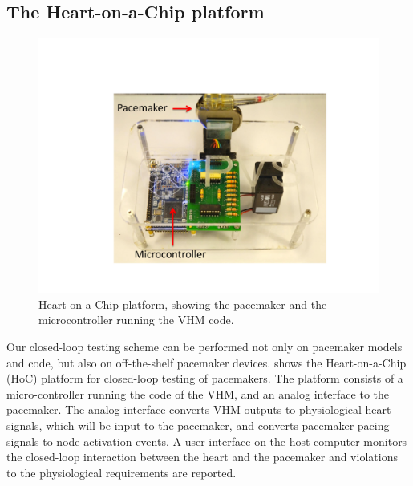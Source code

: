 \subsection{The Heart-on-a-Chip platform}
\label{HoC}

\begin{figure}[!t]
	\centering
	\includegraphics[scale=0.3]{figures/HOCannotated.pdf}		
	\caption{\small Heart-on-a-Chip platform, showing the pacemaker and the microcontroller running the VHM code.}
	\label{fig:hoc}
\end{figure} 

Our closed-loop testing scheme can be performed not only on pacemaker models and code, but also on off-the-shelf pacemaker devices. 
 shows the Heart-on-a-Chip (HoC) platform for closed-loop testing of pacemakers. 
The platform consists of a micro-controller running the code of the VHM, and an analog interface to the pacemaker. 
The analog interface converts VHM outputs to physiological heart signals, which will be input to the pacemaker, and converts pacemaker pacing signals to node activation events.  
A user interface on the host computer monitors the closed-loop interaction between the heart and the pacemaker and violations to the physiological requirements are reported.
